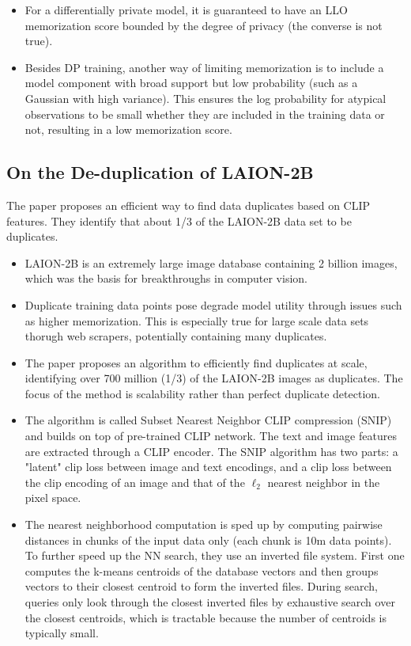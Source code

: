\documentclass{article}
\begin{document}
\begin{itemize}
    \item For a differentially private model, it is guaranteed to have an LLO memorization score bounded by the degree of privacy (the converse is not true).
    \item Besides DP training, another way of limiting memorization is to include a model component with broad support but low probability (such as a Gaussian with high variance). This ensures the log probability for atypical observations to be small whether they are included in the training data or not, resulting in a low memorization score.
\end{itemize}

\subsection{On the De-duplication of LAION-2B}
\begin{tldr}
    The paper proposes an efficient way to find data duplicates based on CLIP features. They identify that about 1/3 of the LAION-2B data set to be duplicates.
\end{tldr}
\begin{itemize}
    \item LAION-2B is an extremely large image database containing 2 billion images, which was the basis for breakthroughs in computer vision.
    \item Duplicate training data points pose degrade model utility through issues such as higher memorization. This is especially true for large scale data sets thorugh web scrapers, potentially containing many duplicates.
    \item The paper proposes an algorithm to efficiently find duplicates at scale, identifying over 700 million (1/3) of the LAION-2B images as duplicates. The focus of the method is scalability rather than perfect duplicate detection.
    \item The algorithm is called Subset Nearest Neighbor CLIP compression (SNIP) and builds on top of pre-trained CLIP network. The text and image features are extracted through a CLIP encoder. The SNIP algorithm has two parts: a "latent" clip loss between image and text encodings, and a clip loss between the clip encoding of an image and that of the $\ell_2$ nearest neighbor in the pixel space. 
    \item The nearest neighborhood computation is sped up by computing pairwise distances in chunks of the input data only (each chunk is 10m data points). To further speed up the NN search, they use an inverted file system. First one computes the k-means centroids of the database vectors and then groups vectors to their closest centroid to form the inverted files. During search, queries only look through the closest inverted files by exhaustive search over the closest centroids, which is tractable because the number of centroids is typically small.
\end{itemize}
\end{document}
